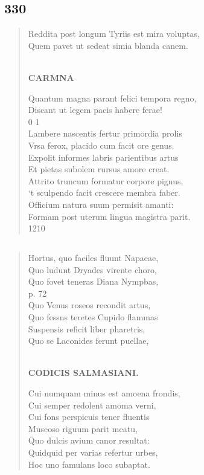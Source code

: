 \documentclass[11pt, a4paper]{report}
\begin{document}
            \subsection*{330}
      \begin{verse}
      Reddita post longum Tyriis est mira voluptas, \\ Quem pavet ut sedeat simia blanda canem. \\ 
        ﻿\pagebreak 
     \marginpar{[268]} \begin{center} \textbf{CARMNA} \end{center}Quantum magna parant felici tempora regno, \\ Discant ut legem pacis habere ferae! \\ 0 1 \\ Lambere nascentis fertur primordia prolis \\ Vrsa ferox, placido cum facit ore genus. \\ Expolit informes labris parientibus artus \\ Et pietas subolem rursus amore creat. \\ Attrito truncum formatur corpore pignus, \\ ‘t sculpendo facit crescere membra faber. \\ Officium natura suum permisit amanti: \\ Formam post uterum lingua magistra parit. \\ 1210 \\ 
      \end{verse}
  
            \subsection*{}
      \begin{verse}
      Hortus, quo faciles fluunt Napaeae, \\ Quo ludunt Dryades virente choro, \\ Quo fovet teneras Diana Nympbas, \\ p. 72 \\ Quo Venus roseos recondit artus, \\ Quo fessns teretes Cupido flammas \\ Suspensis reficit liber pharetris, \\ Quo se Laconides ferunt puellae, \\ 
        ﻿\pagebreak 
    \begin{center} \textbf{CODICIS SALMASIANI.} \end{center} \marginpar{[269]} Cui numquam minus est amoena frondis, \\ Cui semper redolent amoma verni, \\ Cui fons perspicuis tener fluentis \\ Muscoso riguum parit meatu, \\ Quo dulcis avium canor resultat: \\ Quidquid per varias refertur urbes, \\ Hoc uno famulans loco subaptat. \\ 
      \end{verse}
  
\end{document}
